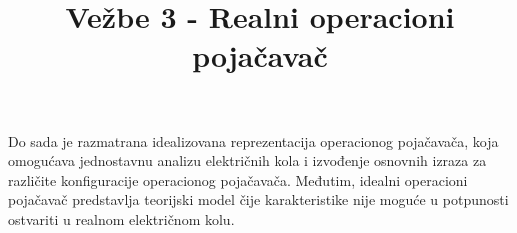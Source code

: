 \documentclass[12pt]{article}
\title{Vežbe 3 - Realni operacioni pojačavač}
\date{}
\author{}
\begin{document}
\maketitle

{Do sada je razmatrana idealizovana reprezentacija operacionog pojačavača, koja omogućava jednostavnu analizu električnih kola i izvođenje osnovnih izraza za različite konfiguracije operacionog pojačavača. Međutim, idealni operacioni pojačavač predstavlja teorijski model čije karakteristike nije moguće u potpunosti ostvariti u realnom električnom kolu.}



\end{document}
